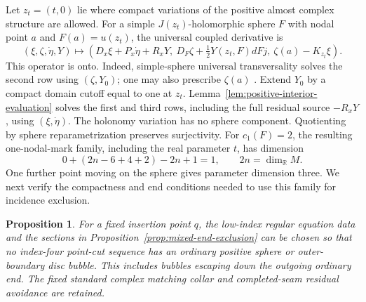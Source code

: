 \documentclass[11pt]{amsart}
\newtheorem{proposition}[theorem]{Proposition}
\theoremstyle{definition}
\theoremstyle{remark}
\theoremstyle{plain}
\begin{document}
Let $z_t=(t,0)$ lie where compact variations of the positive
almost complex structure are allowed. For a simple
$J(z_t)$-holomorphic sphere $F$ with nodal point $a$ and
$F(a)=u(z_t)$, the universal coupled derivative is
\begin{equation}\label{eq:coupled-sphere-attachment-derivative}
 (\xi,\zeta,\dot\eta,Y)\longmapsto
 \left(
 D_x\xi+P_x\dot\eta+R_xY,\
 D_F\zeta+\tfrac12Y(z_t,F)dFj,\
 \zeta(a)-K_{z_t}\xi
 \right).
\end{equation}
This operator is onto. Indeed, simple-sphere universal
transversality solves the second row using $(\zeta,Y_0)$;
one may also prescribe $\zeta(a)$
\cite[Theorem~6.1]{OhZhu09}.
Extend $Y_0$ by a compact domain cutoff equal to one at
$z_t$. Lemma~\ref{lem:positive-interior-evaluation} solves
the first and third rows, including the full residual
source $-R_xY$, using $(\xi,\dot\eta)$.
The holonomy variation has no sphere component.
Quotienting by sphere reparametrization preserves
surjectivity.
For $c_1(F)=2$, the resulting one-nodal-mark family,
including the real parameter $t$, has dimension
\[
             0+(2n-6+4+2)-2n+1=1,
             \qquad 2n=\dim_\mathbb R M.
\]
One further point moving on the sphere gives parameter
dimension three. We next verify the compactness and end
conditions needed to use this family for incidence exclusion.

\begin{proposition}\label{prop:ordinary-positive-exclusion}
For a fixed insertion point $q$, the low-index regular
equation data and the sections in
Proposition~\ref{prop:mixed-end-exclusion} can be chosen so
that no index-four point-cut sequence has an ordinary
positive sphere or outer-boundary disc bubble.
This includes bubbles escaping down the outgoing ordinary
end. The fixed standard complex matching collar and
completed-seam residual avoidance are retained.
\end{proposition}
\end{document}
